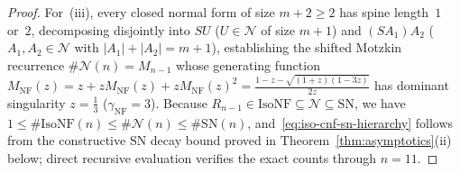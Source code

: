 \documentclass[11pt,reqno]{amsart}
\numberwithin{equation}{section}
\theoremstyle{plain}
\theoremstyle{definition}
\theoremstyle{remark}
\newcommand{\NF}{\mathrm{NF}}
\newcommand{\SN}{\mathrm{SN}}
\begin{document}
\begin{proof}
For~(iii), every closed normal form of size $m + 2 \ge 2$ has spine length~$1$ or~$2$, decomposing disjointly into $S U$ ($U \in \mathcal{N}$ of size $m + 1$) and $(S A_1) A_2$ ($A_1, A_2 \in \mathcal{N}$ with $|A_1| + |A_2| = m + 1$), establishing the shifted Motzkin recurrence $\#\mathcal{N}(n) = M_{n-1}$ whose generating function $M_{\NF}(z) = z + z M_{\NF}(z) + z M_{\NF}(z)^2 = \frac{1 - z - \sqrt{(1+z)(1-3z)}}{2z}$ has dominant singularity $z = \frac{1}{3}$ ($\gamma_{\NF} = 3$). Because $R_{n-1} \in \mathrm{IsoNF} \subseteq \mathcal{N} \subseteq \SN$, we have $1 \le \#\mathrm{IsoNF}(n) \le \#\mathcal{N}(n) \le \#\SN(n)$, and~\eqref{eq:iso-cnf-sn-hierarchy} follows from the constructive $\SN$ decay bound proved in Theorem~\ref{thm:asymptotics}(ii) below; direct recursive evaluation verifies the exact counts through $n = 11$.


\end{proof}
\end{document}

